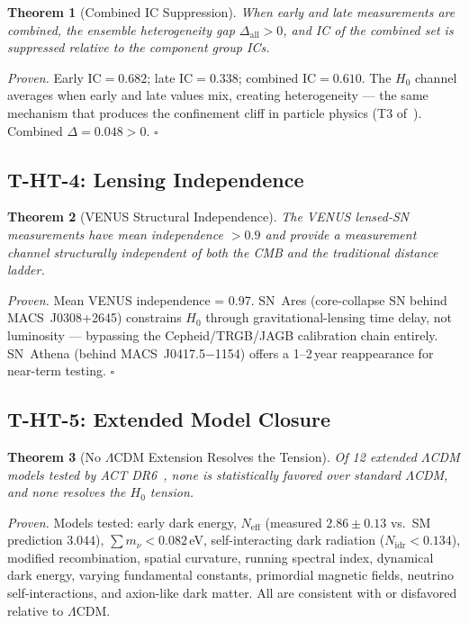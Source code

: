 \documentclass[
  aps,
  prd,
  twocolumn,
  superscriptaddress,
  nofootinbib,
  floatfix
]{revtex4-2}
\newtheorem{theorem}{Theorem}
\newcommand{\IC}{\mathrm{IC}}
\newcommand{\hetgap}{\Delta}
\begin{document}
\begin{theorem}[Combined IC Suppression]\label{thm:T3}
When early and late measurements are combined, the ensemble
heterogeneity gap $\hetgap_{\mathrm{all}} > 0$, and
IC of the combined set is suppressed relative to the
component group ICs.
\end{theorem}

\noindent\textit{Proven.}
Early $\IC = 0.682$; late $\IC = 0.338$; combined
$\IC = 0.610$.
The $H_0$ channel averages when early and late values
mix, creating heterogeneity --- the same mechanism
that produces the confinement cliff in particle
physics (T3 of~\cite{paulus2025physicscoherence}).
Combined $\hetgap = 0.048 > 0$.  \hfill$\square$

\subsection{T-HT-4: Lensing Independence}

\begin{theorem}[VENUS Structural Independence]\label{thm:T4}
The VENUS lensed-SN measurements have mean independence
$> 0.9$ and provide a measurement channel structurally
independent of both the CMB and the traditional distance
ladder.
\end{theorem}

\noindent\textit{Proven.}
Mean VENUS independence = 0.97.
SN~Ares (core-collapse SN behind MACS~J0308+2645)
constrains $H_0$ through gravitational-lensing time delay,
not luminosity --- bypassing the Cepheid/TRGB/JAGB
calibration chain entirely.
SN~Athena (behind MACS~J0417.5$-$1154) offers a
1--2\,year reappearance for near-term testing.  \hfill$\square$

\subsection{T-HT-5: Extended Model Closure}

\begin{theorem}[No $\Lambda$CDM Extension Resolves the Tension]\label{thm:T5}
Of 12 extended $\Lambda$CDM models tested by
ACT DR6~\cite{calabrese2025act_ext}, none is statistically
favored over standard $\Lambda$CDM, and none resolves
the $H_0$ tension.
\end{theorem}

\noindent\textit{Proven.}
Models tested: early dark energy, $N_{\mathrm{eff}}$ (measured
$2.86 \pm 0.13$ vs.\ SM prediction $3.044$), $\sum m_\nu < 0.082$\,eV,
self-interacting dark radiation ($N_{\mathrm{idr}} < 0.134$),
modified recombination, spatial curvature, running spectral index,
dynamical dark energy, varying fundamental constants, primordial
magnetic fields, neutrino self-interactions, and axion-like dark matter.
All are consistent with or disfavored relative to $\Lambda$CDM.
\end{document}
